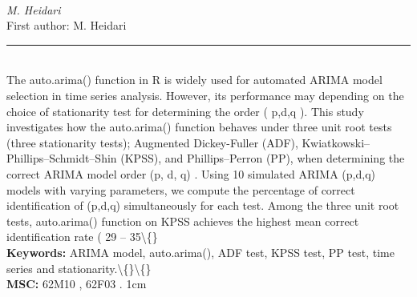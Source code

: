 \documentclass[10pt,twoside]{article}
\begin{document}
\noindent\begin{minipage}[t][\textheight]{\textwidth}
\\[0.35em]
{\itshape M. Heidari}\\[0.2em]
{\footnotesize First author: M. Heidari}\\[0.45em]
\noindent\rule{\textwidth}{0.3pt}\\[0.4em]
{\footnotesize The auto.arima() function in R is widely used for automated ARIMA model selection in time series analysis. However, its performance may depending on the choice of stationarity test for determining the order ( p,d,q ). This study investigates how the auto.arima() function behaves under three unit root tests (three stationarity tests); Augmented Dickey-Fuller (ADF), Kwiatkowski--Phillips--Schmidt--Shin (KPSS), and Phillips--Perron (PP), when determining the correct ARIMA model order (p, d, q) . Using 10 simulated ARIMA (p,d,q) models with varying parameters, we compute the percentage of correct identification of (p,d,q) simultaneously for each test. Among the three unit root tests, auto.arima() function on KPSS achieves the highest mean correct identification rate ( 29 -- 35\textbackslash\{\}}\\[0.4em]
{\footnotesize\bfseries Keywords:} {\footnotesize ARIMA model, auto.arima(), ADF test, KPSS test, PP test, time series and stationarity.\textbackslash\{\}\textbackslash\{\}}\\[0.15em]
{\footnotesize\bfseries MSC:} {\footnotesize 62M10 , 62F03 . 1cm}\\
\vfill
\end{minipage}
\newpage
\end{document}
